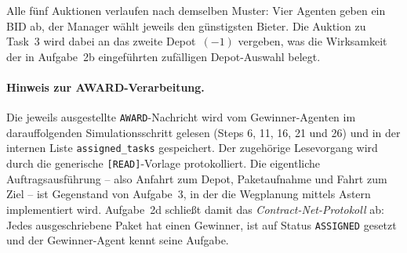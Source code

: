 Alle fünf Auktionen verlaufen nach demselben Muster: Vier Agenten geben ein BID ab, der Manager wählt jeweils den günstigsten Bieter. Die Auktion zu Task~3 wird dabei an das zweite Depot~\((-1)\) vergeben, was die Wirksamkeit der in Aufgabe~2b eingeführten zufälligen Depot-Auswahl belegt.

\paragraph{Hinweis zur AWARD-Verarbeitung.}
Die jeweils ausgestellte \texttt{AWARD}-Nachricht wird vom Gewinner-Agenten im darauffolgenden Simulationsschritt gelesen (Steps 6, 11, 16, 21 und 26) und in der internen Liste \texttt{assigned\_tasks} gespeichert. Der zugehörige Lesevorgang wird durch die generische \texttt{[READ]}-Vorlage protokolliert. Die eigentliche Auftragsausführung -- also Anfahrt zum Depot, Paketaufnahme und Fahrt zum Ziel -- ist Gegenstand von Aufgabe~3, in der die Wegplanung mittels \acs{Astern} implementiert wird. Aufgabe~2d schließt damit das \textit{Contract-Net-Protokoll} ab: Jedes ausgeschriebene Paket hat einen Gewinner, ist auf Status \texttt{ASSIGNED} gesetzt und der Gewinner-Agent kennt seine Aufgabe.


